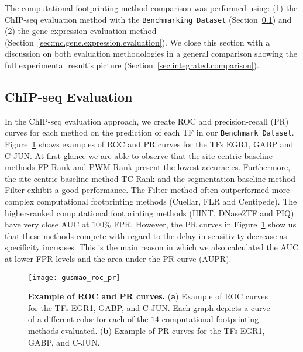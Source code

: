 The computational footprinting method comparison was performed using: (1) the ChIP-seq evaluation method with the {\tt Benchmarking Dataset} (Section~\ref{sec:mc.chipseq.evaluation}) and (2) the gene expression evaluation method (Section~\ref{sec:mc.gene.expression.evaluation}). We close this section with a discussion on both evaluation methodologies in a general comparison showing the full experimental result's picture (Section~\ref{sec:integrated.comparison}).

\subsection{ChIP-seq Evaluation}
\label{sec:mc.chipseq.evaluation}

In the ChIP-seq evaluation approach, we create ROC and precision-recall (PR) curves for each method on the prediction of each TF in our {\tt Benchmark Dataset}. Figure~\ref{fig:gusmao_roc_pr} shows examples of ROC and PR curves for the TFs EGR1, GABP and C-JUN. At first glance we are able to observe that the site-centric baseline methods FP-Rank and PWM-Rank present the lowest accuracies. Furthermore, the site-centric baseline method TC-Rank and the segmentation baseline method Filter exhibit a good performance. The Filter method often outperformed more complex computational footprinting methods (Cuellar, FLR and Centipede). The higher-ranked computational footprinting methods (HINT, DNase2TF and PIQ) have very close AUC at $100\%$ FPR. However, the PR curves in Figure~\ref{fig:gusmao_roc_pr} show us that these methods compete with regard to the delay in sensitivity decrease as specificity increases. This is the main reason in which we also calculated the AUC at lower FPR levels and the area under the PR curve (AUPR).

\begin{figure}[h!]
\centering
\texttt{[image: gusmao\_roc\_pr]}
\caption[Example of ROC and PR curves]{\textbf{Example of ROC and PR curves.} (\textbf{a}) Example of ROC curves for the TFs EGR1, GABP, and C-JUN. Each graph depicts a curve of a different color for each of the $14$ computational footprinting methods evaluated. (\textbf{b}) Example of PR curves for the TFs EGR1, GABP, and C-JUN.}
\label{fig:gusmao_roc_pr}
\end{figure}

